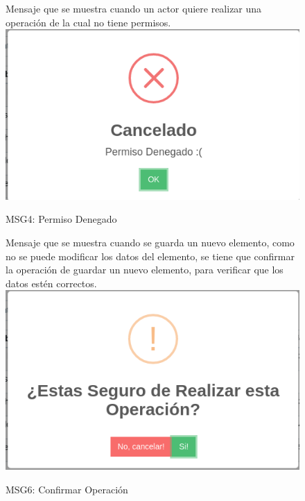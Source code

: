 \begin{figure}[htbp!]
	\begin{center}
	Mensaje que se muestra cuando un actor quiere realizar una operación de la cual no tiene permisos.	
		\includegraphics[scale=.5]{Pantallas/PermisoDenegado}
		\caption{MSG4: Permiso Denegado}
	\end{center}
\end{figure}


\begin{figure}[htbp!]
	\begin{center}
	Mensaje que se muestra cuando se guarda un nuevo elemento, como no se puede modificar los datos del elemento, se tiene que confirmar la operación de guardar un nuevo elemento, para verificar que los datos estén correctos.
		\includegraphics[scale=.5]{Pantallas/ConfirmacionOperacion}
		\caption{MSG6: Confirmar Operación}
	\end{center}
\end{figure}